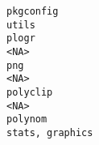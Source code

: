 \documentclass[
  letterpaper,
  DIV=11,
  numbers=noendperiod]{scrreprt}
\begin{document}
\begin{verbatim}
pkgconfig                                                                                                                                                                                                                                                                                                                                                                                                                                                                                                                                                                                                            utils
plogr                                                                                                                                                                                                                                                                                                                                                                                                                                                                                                                                                                                                                 <NA>
png                                                                                                                                                                                                                                                                                                                                                                                                                                                                                                                                                                                                                   <NA>
polyclip                                                                                                                                                                                                                                                                                                                                                                                                                                                                                                                                                                                                              <NA>
polynom                                                                                                                                                                                                                                                                                                                                                                                                                                                                                                                                                                                                    stats, graphics

\end{verbatim}
\end{document}
